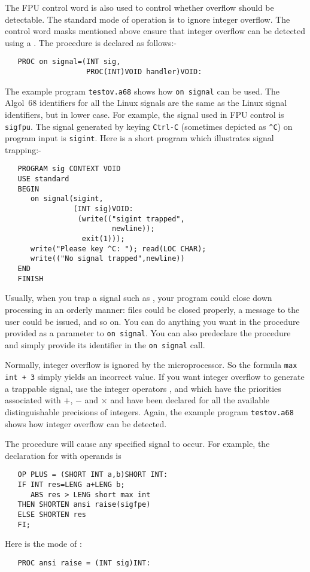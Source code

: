 The FPU control word is also used to control whether overflow should
be detectable. The standard mode of operation is to ignore integer
overflow. The control word masks mentioned above ensure that integer
overflow can be detected using a . The procedure
 is declared as follows:-
\begin{verbatim}
   PROC on signal=(INT sig,
                   PROC(INT)VOID handler)VOID:
\end{verbatim}
\noindent
The example program \verb|testov.a68| shows how \verb|on signal| can be
used. The Algol~68 identifiers for all the Linux signals are the same
as the Linux signal identifiers, but in lower case. For example, the
signal used in FPU control is \verb|sigfpu|. The signal generated by
keying \verb|Ctrl-C| (sometimes depicted as \verb|^C|) on program input
is \verb|sigint|. Here is a short program which illustrates signal
trapping:-
\begin{verbatim}
   PROGRAM sig CONTEXT VOID
   USE standard
   BEGIN
      on signal(sigint,
                (INT sig)VOID:
                 (write(("sigint trapped",
                         newline));
                  exit(1)));
      write("Please key ^C: "); read(LOC CHAR);
      write(("No signal trapped",newline))
   END
   FINISH
\end{verbatim}
\noindent
Usually, when you trap a signal such as , your program
could close down processing in an orderly manner: files could be closed
properly, a message to the user could be issued, and so on. You can do
anything you want in the procedure provided as a parameter to
\verb|on signal|. You can also predeclare the procedure and simply
provide its identifier in the \verb|on signal| call.

Normally, integer overflow is ignored by the microprocessor. So the
formula \verb|max int + 3| simply yields an incorrect value. If you
want integer overflow to generate a trappable signal, use the integer
operators ,  and 
which have the priorities associated with $+$, $-$ and $\times$ and
have been declared for all the available distinguishable precisions of
integers. Again, the example program \verb|testov.a68| shows how
integer overflow can be detected.

The procedure  will cause any specified signal to
occur. For example, the declaration for  with
 operands is
\begin{verbatim}
   OP PLUS = (SHORT INT a,b)SHORT INT:
   IF INT res=LENG a+LENG b;
      ABS res > LENG short max int
   THEN SHORTEN ansi raise(sigfpe)
   ELSE SHORTEN res
   FI;
\end{verbatim}
\noindent
Here is the mode of :
\begin{verbatim}
   PROC ansi raise = (INT sig)INT:
\end{verbatim}

